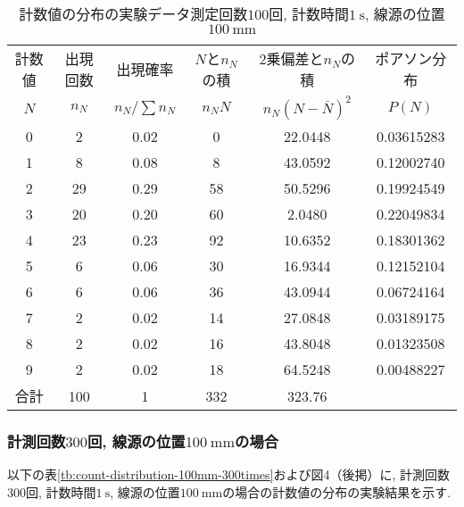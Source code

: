 \documentclass{jarticle}
\begin{document}
\begin{table}[H]
  \caption{計数値の分布の実験データ\protect\linebreak 測定回数$100$回, 計数時間$1\ \mathrm{s}$, 線源の位置$100\ \mathrm{mm}$}
  \label{tb:count-distribution-100mm-100times}
  \hspace{-1cm}
  \begin{tabular}{cccccc}
    \hline
    計数値 & 出現回数 & 出現確率 & $N$と$n_N$の積 & 2乗偏差と$n_N$の積 & ポアソン分布 \\
    $N$ & $n_N$ & $n_N/\sum n_N$ & $n_N N$ & $n_N(N-\overline{N})^2$ & $P(N)$ \\
    \hline
    0 & 2 & 0.02 & 0 & 22.0448 & 0.03615283 \\
    1 & 8 & 0.08 & 8 & 43.0592 & 0.12002740 \\
    2 & 29 & 0.29 & 58 & 50.5296 & 0.19924549 \\
    3 & 20 & 0.20 & 60 & 2.0480 & 0.22049834 \\
    4 & 23 & 0.23 & 92 & 10.6352 & 0.18301362 \\
    5 & 6 & 0.06 & 30 & 16.9344 & 0.12152104 \\
    6 & 6 & 0.06 & 36 & 43.0944 & 0.06724164 \\
    7 & 2 & 0.02 & 14 & 27.0848 & 0.03189175 \\
    8 & 2 & 0.02 & 16 & 43.8048 & 0.01323508 \\
    9 & 2 & 0.02 & 18 & 64.5248 & 0.00488227 \\
    \hline
    合計 & 100 & 1 & 332 & 323.76 & \\
    \hline
  \end{tabular}
\end{table}



\subsubsection{計測回数$300$回, 線源の位置$100\ \mathrm{mm}$の場合}

以下の表\ref{tb:count-distribution-100mm-300times}および図4（後掲）に, 計測回数$300$回, 計数時間$1\ \mathrm{s}$, 線源の位置$100\ \mathrm{mm}$の場合の計数値の分布の実験結果を示す.
\end{document}

